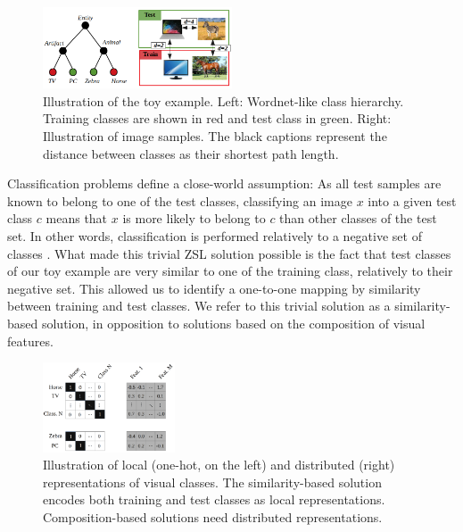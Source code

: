 \begin{figure}[h]
\includegraphics[width=0.5\textwidth]{Figure_8.png}
\caption{
Illustration of the toy example.
Left: Wordnet-like class hierarchy. 
Training classes are shown in red and test class in green.
Right: Illustration of image samples. 
The black captions represent the distance between classes as their shortest path length.
}
\end{figure}


Classification problems define a close-world assumption:
As all test samples are known to belong to one of the test classes,
classifying an image $x$ into a given test class $c$ means that $x$ is more likely to belong to $c$ than other classes of the test set.
In other words, classification is performed relatively to a negative set of classes \cite{torralba2011unbiased}. 
What made this trivial ZSL solution possible is the fact that test classes of our toy example are very similar to one of the training class, relatively to their negative set.
This allowed us to identify a one-to-one mapping by similarity between training and test classes.
We refer to this trivial solution as a similarity-based solution, in opposition to solutions based on the composition of visual features.

\begin{figure}[h]
\centering
\includegraphics[width=0.35\textwidth]{Figure_9.png}
\caption{
Illustration of local (one-hot, on the left) and distributed (right) representations of visual classes.
The similarity-based solution encodes both training and test classes as local representations.
Composition-based solutions need distributed representations.
}
\end{figure}


